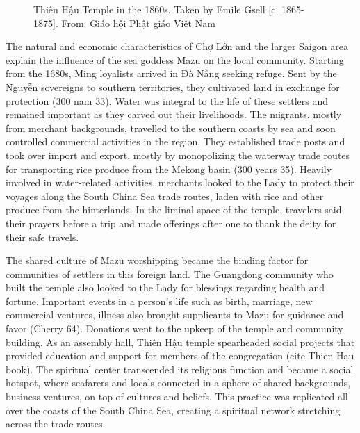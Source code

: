 \begin{figure}[!ht]
\begin{center}
\vspace{-.2 in}
\caption[\vi Thiên Hậu Temple in the 1860s \en]{\vi Thiên Hậu Temple in the 1860s. Taken by Emile Gsell [c. 1865-1875]. From: Giáo hội Phật giáo Việt Nam \en}\label{thienhau_past}
\end{center}
\vspace{-.2 in}
\end{figure}
\vi
The natural and economic characteristics of Chợ Lớn and the larger Saigon area explain the influence of the sea goddess Mazu on the local community. Starting from the 1680s, Ming loyalists arrived in Đà Nẵng seeking refuge. Sent by the Nguyễn sovereigns to southern territories, they cultivated  land in exchange for protection (300 nam 33). Water was integral to the life of these settlers and remained important as they carved out their livelihoods. The migrants, mostly from merchant backgrounds, travelled to the southern coasts by sea and soon controlled commercial activities in the region. They established trade posts and took over import and export, mostly by monopolizing the waterway trade routes for transporting rice produce from the Mekong basin (300 years 35). Heavily involved in water-related activities, merchants looked to the Lady to protect their voyages along the South China Sea trade routes, laden with rice and other produce from the hinterlands. In the liminal space of the temple, travelers said their prayers before a trip and made offerings after one to thank the deity for their safe travels.

The shared culture of Mazu worshipping became the binding factor for communities of settlers in this foreign land. The Guangdong community who built the temple also looked to the Lady for blessings regarding health and fortune. Important events in a person’s life such as birth, marriage, new commercial ventures, illness also brought supplicants to Mazu for guidance and favor (Cherry 64). Donations went to the upkeep of the temple and community building. As an assembly hall, Thiên Hậu temple spearheaded social projects that provided education and support for members of the congregation (cite Thien Hau book). The spiritual center transcended its religious function and became a social hotspot, where seafarers and locals connected in a sphere of shared backgrounds, business ventures, on top of cultures and beliefs. This practice was replicated all over the coasts of the South China Sea, creating a spiritual network stretching across the trade routes. %

